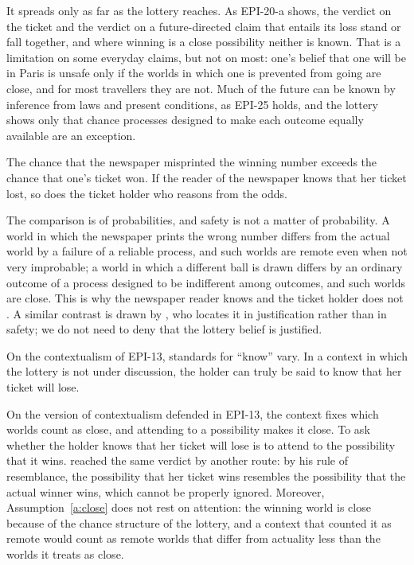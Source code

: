 \documentclass{situationist-preprint}
\begin{document}
\begin{reply}
It spreads only as far as the lottery reaches. As EPI-20-a shows, the verdict on the ticket and the verdict on a future-directed claim that entails its loss stand or fall together, and where winning is a close possibility neither is known. That is a limitation on some everyday claims, but not on most: one's belief that one will be in Paris is unsafe only if the worlds in which one is prevented from going are close, and for most travellers they are not. Much of the future can be known by inference from laws and present conditions, as EPI-25 holds, and the lottery shows only that chance processes designed to make each outcome equally available are an exception.
\end{reply}

\begin{objection}
The chance that the newspaper misprinted the winning number exceeds the chance that one's ticket won. If the reader of the newspaper knows that her ticket lost, so does the ticket holder who reasons from the odds.
\end{objection}

\begin{reply}
The comparison is of probabilities, and safety is not a matter of probability. A world in which the newspaper prints the wrong number differs from the actual world by a failure of a reliable process, and such worlds are remote even when not very improbable; a world in which a different ball is drawn differs by an ordinary outcome of a process designed to be indifferent among outcomes, and such worlds are close. This is why the newspaper reader knows and the ticket holder does not \citep{Pritchard2005}. A similar contrast is drawn by \citet{Smith2010}, who locates it in justification rather than in safety; we do not need to deny that the lottery belief is justified.
\end{reply}

\begin{objection}[Context]
On the contextualism of EPI-13, standards for \enquote{know} vary. In a context in which the lottery is not under discussion, the holder can truly be said to know that her ticket will lose.
\end{objection}

\begin{reply}
On the version of contextualism defended in EPI-13, the context fixes which worlds count as close, and attending to a possibility makes it close. To ask whether the holder knows that her ticket will lose is to attend to the possibility that it wins. \citet{Lewis1996} reached the same verdict by another route: by his rule of resemblance, the possibility that her ticket wins resembles the possibility that the actual winner wins, which cannot be properly ignored. Moreover, Assumption~\ref{a:close} does not rest on attention: the winning world is close because of the chance structure of the lottery, and a context that counted it as remote would count as remote worlds that differ from actuality less than the worlds it treats as close.
\end{reply}
\end{document}
